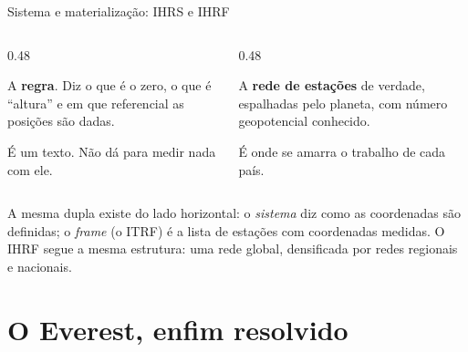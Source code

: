 \documentclass[aspectratio=169,11pt]{beamer}
\newcommand{\bnum}[1]{\textbf{\textcolor{mTeal}{#1}}}
\begin{document}
\begin{frame}{Sistema e materialização: IHRS e IHRF}
  \begin{columns}[T]
    \begin{column}{0.48\textwidth}
      \begin{ideia}[title={IHRS --- o sistema}]
        A \bnum{regra}. Diz o que é o zero, o que é ``altura'' e em que referencial as
        posições são dadas.
        \medskip

        É um texto. Não dá para medir nada com ele.
      \end{ideia}
    \end{column}
    \begin{column}{0.48\textwidth}
      \begin{ideia}[title={IHRF --- o frame}]
        A \bnum{rede de estações} de verdade, espalhadas pelo planeta, com número
        geopotencial conhecido.
        \medskip

        É onde se amarra o trabalho de cada país.
      \end{ideia}
    \end{column}
  \end{columns}
  \bigskip
  {\small A mesma dupla existe do lado horizontal: o \emph{sistema} diz como as
  coordenadas são definidas; o \emph{frame} (o ITRF) é a lista de estações com
  coordenadas medidas. O IHRF segue a mesma estrutura: uma rede global, densificada por
  redes regionais e nacionais.}
\end{frame}

\section{O Everest, enfim resolvido}
\end{document}
